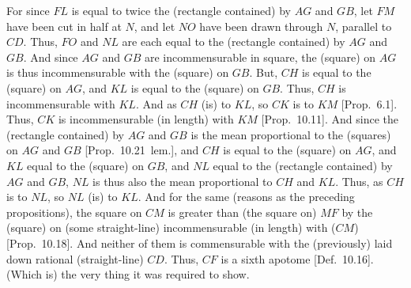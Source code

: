 \begin{Parallel}{}{}
{For since $FL$ is equal to twice the (rectangle contained) by $AG$
and $GB$, let $FM$ have been cut in half at $N$, and let $NO$
have been drawn through $N$, parallel to $CD$. Thus, $FO$ and $NL$
are each equal to the (rectangle contained) by $AG$ and $GB$. And since
$AG$ and $GB$ are incommensurable in square, the (square) on $AG$
is thus incommensurable with the (square) on $GB$. But, $CH$ is equal to
the (square) on $AG$, and $KL$ is equal to the (square) on $GB$. 
Thus, $CH$ is incommensurable with $KL$. And as $CH$ (is) to
$KL$, so $CK$ is to $KM$ [Prop.~6.1].  Thus,
$CK$ is incommensurable (in length) with $KM$ [Prop.~10.11]. And since the (rectangle contained)
by $AG$ and $GB$ is the mean proportional to the (squares) on 
$AG$ and $GB$ [Prop.~10.21~lem.], and $CH$ is equal to the (square) on $AG$, and $KL$ 
equal to the (square) on $GB$, and $NL$ equal to the (rectangle contained)
by $AG$ and $GB$, $NL$ is thus also the mean proportional to
$CH$ and $KL$. Thus, as $CH$ is to $NL$, so $NL$ (is) to $KL$.
And for the same (reasons as the preceding propositions), the square on 
$CM$ is greater than (the square on) $MF$ by the (square) on (some
straight-line) incommensurable (in length) with ($CM$) [Prop.~10.18]. And neither
of them is commensurable with the (previously) laid down rational 
(straight-line) $CD$. Thus, $CF$ is a sixth apotome 
[Def.~10.16]. (Which is) the very thing it was required to show.}
\end{Parallel}

